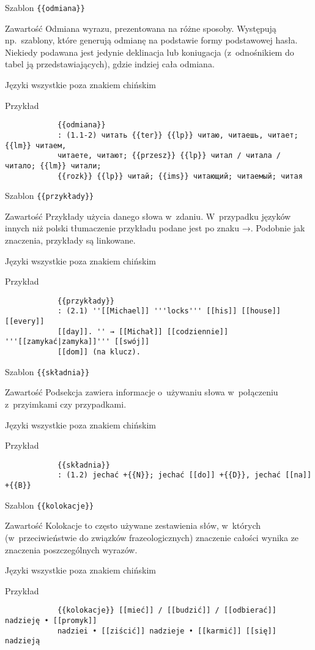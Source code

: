 \begin{opis}
	\item[Szablon] \verb|{{odmiana}}|
	\item[Zawartość] Odmiana wyrazu, prezentowana na różne sposoby. Występują np.\ szablony, które generują odmianę na podstawie formy podstawowej hasła. Niekiedy podawana jest jedynie deklinacja lub koniugacja (z~odnośnikiem do tabel ją przedstawiających), gdzie indziej cała odmiana.
	\item[Języki] wszystkie poza znakiem chińskim
	\item[Przykład]
		\begin{verbatim}
			{{odmiana}}
			: (1.1-2) читать {{ter}} {{lp}} читаю, читаешь, читает; {{lm}} читаем,
			читаете, читают; {{przesz}} {{lp}} читал / читала / читало; {{lm}} читали;
			{{rozk}} {{lp}} читай; {{ims}} читающий; читаемый; читая
		\end{verbatim}
\end{opis}
\spacer
\begin{opis}
	\item[Szablon] \verb|{{przykłady}}|
	\item[Zawartość] Przykłady użycia danego słowa w~zdaniu. W~przypadku języków innych niż polski tłumaczenie przykładu podane jest po znaku →. Podobnie jak znaczenia, przykłady są linkowane.
	\item[Języki] wszystkie poza znakiem chińskim
	\item[Przykład]
		\begin{verbatim}
			{{przykłady}}
			: (2.1) ''[[Michael]] '''locks''' [[his]] [[house]] [[every]]
			[[day]]. '' → [[Michał]] [[codziennie]] '''[[zamykać|zamyka]]''' [[swój]]
			[[dom]] (na klucz).
		\end{verbatim}
\end{opis}
\spacer
\begin{opis}
	\item[Szablon] \verb|{{składnia}}|
	\item[Zawartość] Podsekcja zawiera informacje o~używaniu słowa w~połączeniu z~przyimkami czy przypadkami.
	\item[Języki] wszystkie poza znakiem chińskim
	\item[Przykład]
		\begin{verbatim}
			{{składnia}}
			: (1.2) jechać +{{N}}; jechać [[do]] +{{D}}, jechać [[na]] +{{B}}
		\end{verbatim}
\end{opis}
\spacer
\begin{opis}
	\item[Szablon] \verb|{{kolokacje}}|
	\item[Zawartość] Kolokacje to często używane zestawienia słów, w~których (w~przeciwieństwie do związków frazeologicznych) znaczenie całości wynika ze znaczenia poszczególnych wyrazów.
	\item[Języki] wszystkie poza znakiem chińskim
	\item[Przykład]
		\begin{verbatim}
			{{kolokacje}} [[mieć]] / [[budzić]] / [[odbierać]] nadzieję • [[promyk]]
			nadziei • [[ziścić]] nadzieje • [[karmić]] [[się]] nadzieją
		\end{verbatim}
\end{opis}
